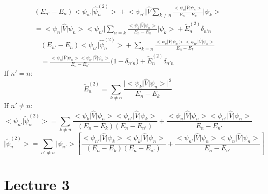 \documentclass[12pt]{article}
\begin{document}
\begin{multline*}
	(E_{n'} - E_n)	\big< \psi_{n'} \big| \hat{\psi}^{(2)}_n \big> + \big<\psi_{n'} \big|
	\hat{V} \sum_{k\neq n} \frac{\big< \psi_k \big| \hat{V} \big| \psi_n \big>}{E_n - E_k}
	\big|\psi_k \big>\\
	= \big<\psi_n \big| \hat{V}\big| \psi_n\big>\big<\psi_{n'}\big|\sum_{n=k}\frac{\big<\psi_k\big|
	\hat{V}\big|\psi_n\big>}{E_n - E_k}\big|\psi_k\big> + \tilde{E}^{(2)}_n \delta_{n'n} 
\end{multline*}
\begin{multline*}
	(E_{n'} - E_n)	\big< \psi_{n'} \big| \hat{\psi}^{(2)}_n \big> +
	\sum_{k=n} \frac{\big<\psi_k\big|\hat{V}\big|\psi_n\big>\big<\psi_{n'}\big|\hat{V}\big|\psi_k\big>}
	{E_n - E_k}\\
	= \frac{\big<\psi_n\big|\hat{V}\big|\psi_n\big>\big<\psi_{n'}\big|\hat{V}\big|\psi_n\big>}
	{E_n - E_{n'}}\bigg(1-\delta_{n'n}\bigg) + \tilde{E}^{(2)}_n \delta_{n'n}
\end{multline*}
If $n' = n$:
\begin{equation}
	\boxed{\tilde{E}^{(2)}_n = \sum_{k\neq n} \frac{\big|\big<\psi_k\big|\hat{V}\big|\psi_n\big>\big|^2}
	{E_n - E_k}}
\end{equation}
If $n' \neq n$:
\begin{equation}
	\big<\psi_{n'}\big|\tilde{\psi}^{(2)}_n \big> = \sum_{k\neq n} \frac{\big<\psi_k\big|\hat{V}\big|
	\psi_n\big>\big<\psi_{n'}\big|\hat{V}\big|\psi_{k}\big>}{(E_n - E_k)(E_n - E_{n'})} + 
	\frac{\big<\psi_n\big|\hat{V}\big|\psi_n\big>\big<\psi_{n'}\big|\hat{V}\big|\psi_n\big>}
	{E_n - E_{n'}}
\end{equation}
\begin{equation}
	\big|\tilde{\psi}^{(2)}_n \big> = \sum_{n'\neq n} \bigg| \psi_{n'}\bigg> \left[\frac{\big<\psi_{n'}\big|
	\hat{V}\big|\psi_k\big>\big<\psi_k\big|\hat{V}\big|\psi_n\big>}{(E_n - E_k)(E_n-E_{n'})}
	+\frac{\big<\psi_{n'}\big|\hat{V}\big|\psi_n\big>\big<\psi_n|\hat{V}\big|\psi_n\big>}
	{E_n - E_{n'}}\right] 
\end{equation}
\newpage
\section{Lecture 3}
\end{document}
